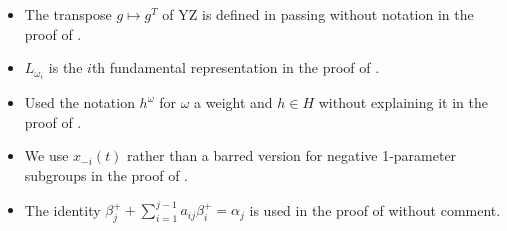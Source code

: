 \documentclass[12pt]{amsart}
\numberwithin{equation}{section}
\begin{document}
\begin{itemize}
  \item 
    The transpose $g \mapsto g^T$ of YZ is defined in passing without notation in the proof of .
  
  \item 
    $L_{\omega_i}$ is the $i$th fundamental representation in the proof of .

  \item 
    Used the notation $h^\omega$ for $\omega$ a weight and $h \in H$ without explaining it in the proof of .

  \item 
    We use $x_{-i}(t)$ rather than a barred version for negative 1-parameter subgroups in the proof of .

  \item 
    The identity $\beta_j^+ + \sum_{i=1}^{j-1} a_{ij} \beta_i^+ = \alpha_j$ is used in the proof of  without comment.
\end{itemize}



\end{document}
